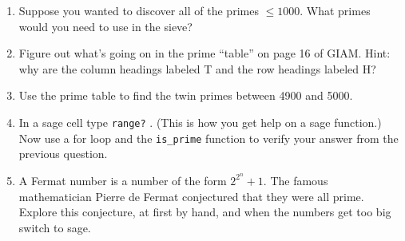 \documentclass{amsart}
\begin{document}
\begin{enumerate}
\vspace{.5in}

\item Suppose you wanted to discover all of the primes $\leq 1000$.  What primes would you need to use in the sieve?

\vfill

\item Figure out what's going on in the prime ``table'' on page 16 of GIAM.  Hint: why are the column headings labeled T and the row headings labeled H?

\vfill

\newpage

\item Use the prime table to find the twin primes between 4900 and 5000. 

\vfill

\item In a sage cell type \hspace{12pt} {\tt range?} \hspace{12pt}.  (This is how you get help on a sage function.)  Now use a for loop and the {\tt is\_prime} function to verify your answer from the previous question.

\vfill

\item A Fermat number is a number of the form $2^{2^n}+1$.  The famous mathematician Pierre de Fermat conjectured that they were all prime.  Explore this conjecture, at first by hand, and when the numbers get too big switch to sage.

\vfill


\end{enumerate}
\end{document}
